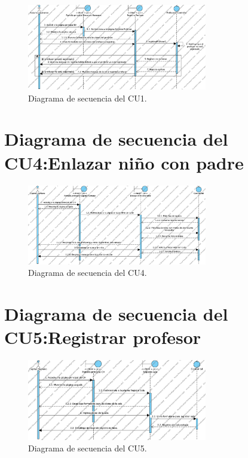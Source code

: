 \begin{figure}[htbp]
\centering
\includegraphics[width=0.7\textwidth]{images/diagramaSecuenciaCU1.png}
\caption{Diagrama de secuencia del CU1.}
\label{fig:diagramaSecuenciaCU1}
\end{figure}

\section{Diagrama de secuencia del CU4:Enlazar niño con padre}


\begin{figure}[htbp]
\centering
\includegraphics[width=0.7\textwidth]{images/diagramaSecuenciaCU4.png}
\caption{Diagrama de secuencia del CU4.}
\label{fig:diagramaSecuenciaCU4}
\end{figure}

\newpage
\section{Diagrama de secuencia del CU5:Registrar profesor}


\begin{figure}[htbp]
\centering
\includegraphics[width=0.7\textwidth]{images/diagramaSecuenciaCU5.png}
\caption{Diagrama de secuencia del CU5.}
\label{fig:diagramaSecuenciaCU5}
\end{figure}

